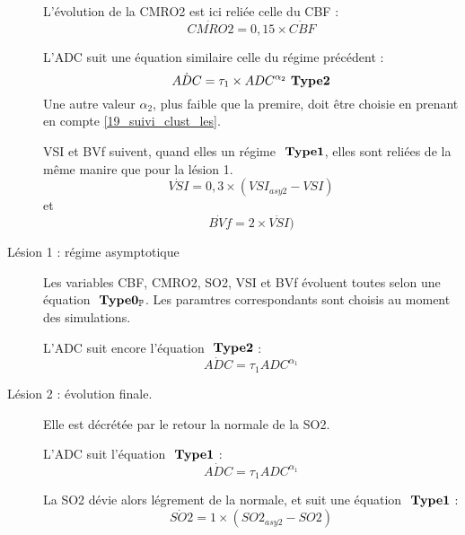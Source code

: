 \begin{description}
\par
L'\'evolution de la CMRO2 est ici reli\'ee  celle du CBF :
\begin{equation}
\dot{CMRO2}=0,15\times\dot{CBF}
\end{equation}

L'ADC suit une \'equation similaire  celle du r\'egime pr\'ec\'edent :
\begin{equation}
\dot{ADC} = \tau_1\times ADC^{\alpha_2} \ \mathbf{Type 2}
\label{adc_is_tr}
\end{equation}
Une autre valeur $\alpha_2$, plus faible que la premire, doit \^etre choisie en prenant en compte \ref{19_suivi_clust_les}.

VSI et BVf suivent, quand  elles un r\'egime $\ \mathbf{Type 1}$, elles sont reli\'ees de la m\^eme manire que pour la l\'esion 1.
\begin{equation}
\dot{VSI}=0,3\times (VSI_{asy2}-VSI)
\end{equation}
et%
\begin{equation}
\dot{BVf}=2\times\dot{VSI})
\end{equation}
%
\item[L\'esion 1 : r\'egime asymptotique] Les variables CBF, CMRO2, SO2, VSI et BVf \'evoluent toutes selon une \'equation $\ \mathbf{Type 0_{\mathbb{P}}}$. %
Les paramtres correspondants sont choisis au moment des simulations.

\par
L'ADC suit encore l'\'equation $\ \mathbf{Type 2}$ :
\begin{equation}
\dot{ADC}=\tau_1ADC^{\alpha_1}
\end{equation}
%
\item[L\'esion 2 : \'evolution finale. ] Elle est d\'ecr\'et\'ee par le retour  la normale de la SO2.
\par
L'ADC suit l'\'equation $\ \mathbf{Type 1}$ :
\begin{equation}
\dot{ADC}=\tau_1ADC^{\alpha_1}
\end{equation}

La SO2 d\'evie alors l\'egrement de la normale, et suit une \'equation $\ \mathbf{Type 1}$ :
\begin{equation}
\dot{SO2}=1\times (SO2_{asy2}-SO2)
\end{equation}


\end{description}
